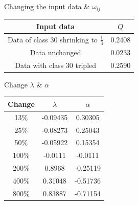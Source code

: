 \documentclass{mcmthesis}
\begin{document}
\begin{minipage}{\textwidth}
 \begin{minipage}[t]{0.45\textwidth}
  \centering
     \makeatletter{}\makeatother\caption{Changing the input data \& $\omega_{ij}$}
       \begin{tabular}{cc} 
	\toprule[1.5pt]
Input data & $Q$\\
\midrule[1pt]
Data of class 30 shrinking to $\frac{1}{3}$ & 0.2408\\
Data unchanged & 0.0233\\
Data with class 30 tripled & 0.2590\\
\bottomrule[1.5pt]
	\end{tabular}
  \end{minipage}
  \begin{minipage}[t]{0.45\textwidth}
   \centering
        \makeatletter{}\makeatother\caption{Change $\lambda$ \& $\alpha$}
         \begin{tabular}{ccc}        
          \toprule[1.5pt]
Change & $\lambda$ & $\alpha$\\
\midrule[1pt]
13\% & -0.09435 & 0.30305\\
25\% & -0.08273 & 0.25043\\
50\% & -0.05922 & 0.15354\\
100\% & -0.0111 & -0.0111\\
200\% & 0.8968 & -0.25119\\
400\% & 0.31048 & -0.51736\\
800\% & 0.83887 & -0.71154\\
\bottomrule[1.5pt]
	  \end{tabular}
   \end{minipage}
\end{minipage}
\end{document}
